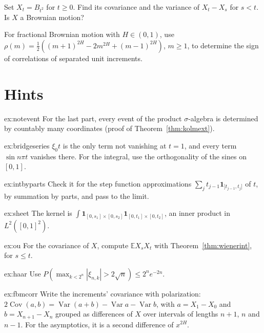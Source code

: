 \begin{exercise}[$\star\star$]\label{ex:v12timechange}
Set $X_t=B_{t^2}$ for $t\ge0$. Find its covariance and the variance of $X_t-X_s$ for $s<t$. Is $X$ a Brownian motion?
\end{exercise}

\begin{exercise}[$\star\star\star$]\label{ex:v12fbmsign}
For fractional Brownian motion with $H\in(0,1)$, use $\rho(m)=\frac12((m+1)^{2H}-2m^{2H}+(m-1)^{2H})$, $m\ge1$, to determine the sign of correlations of separated unit increments.
\end{exercise}

\section{Hints}

\begin{hint}{ex:notevent}
For the last part, every event of the product $\sigma$-algebra is determined by countably many coordinates (proof of Theorem~\ref{thm:kolmext}).
\end{hint}

\begin{hint}{ex:bridgeseries}
$\xi_0t$ is the only term not vanishing at $t=1$, and every term $\sin n\pi t$ vanishes there. For the integral, use the orthogonality of the sines on $[0,1]$.
\end{hint}

\begin{hint}{ex:intbyparts}
Check it for the step function approximations $\sum_j t_{j-1}\mathbf 1_{]t_{j-1},t_j]}$ of $t$, by summation by parts, and pass to the limit.
\end{hint}

\begin{hint}{ex:sheet}
The kernel is $\int\mathbf 1_{[0,s_1]\times[0,s_2]}\mathbf 1_{[0,t_1]\times[0,t_2]}$, an inner product in $L^2([0,1]^2)$.
\end{hint}

\begin{hint}{ex:ou}
For the covariance of $X$, compute $\mathbb E X_sX_t$ with Theorem~\ref{thm:wienerint}, for $s\le t$.
\end{hint}

\begin{hint}{ex:haar}
Use $P(\max_{k<2^n}|\xi_{n,k}|>2\sqrt n)\le2^ne^{-2n}$.
\end{hint}

\begin{hint}{ex:fbmcorr}
Write the increments' covariance with polarization: $2\operatorname{Cov}(a,b)=\operatorname{Var}(a+b)-\operatorname{Var}a-\operatorname{Var}b$, with $a=X_1-X_0$ and $b=X_{n+1}-X_n$ grouped as differences of $X$ over
intervals of lengths $n+1$, $n$ and $n-1$. For the asymptotics, it is a second difference of $x^{2H}$.
\end{hint}

